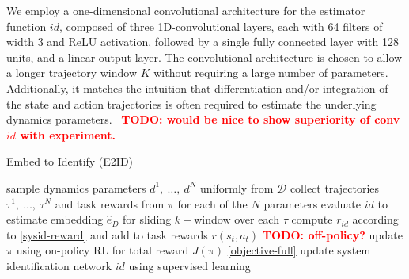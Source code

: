 \documentclass{article}
\newcommand{\E}{\mathbb{E}}
\newcommand{\TODO}[1]{\textcolor{red}{\textbf{TODO: #1}}}
\newcommand{\cA}{\mathcal{A}}
\newcommand{\cH}{\mathcal{H}}
\newcommand{\cL}{\mathcal{L}}
\newcommand{\cS}{\mathcal{S}}
\newcommand{\idfn}{id}
\newcommand{\latent}{\cL}
\newcommand{\idset}{\mathcal{D}}
\newcommand{\idvar}{d}
\begin{document}
We employ a one-dimensional convolutional architecture for the estimator function $\idfn$,
composed of three 1D-convolutional layers, each with 64 filters of width 3 and ReLU activation,
followed by a single fully connected layer with 128 units, and a linear output layer.
The convolutional architecture is chosen to allow a longer trajectory window $K$ without requiring a large number of parameters.
Additionally, it matches the intuition that differentiation and/or integration of the state and action trajectories
is often required to estimate the underlying dynamics parameters.
~\TODO{would be nice to show superiority of conv $\idfn$ with experiment.}




\begin{algorithm}[hb]
\caption{Embed to Identify (E2ID)}
\begin{algorithmic}
  \State sample dynamics parameters $\idvar^1,\ \dots,\ \idvar^N$ uniformly from $\idset$
  \State collect trajectories $\tau^1,\ \dots,\ \tau^N$ and task rewards from $\pi$ for each of the $N$ parameters
  \State evaluate $\idfn$ to estimate embedding $\hat e_D$ for sliding $k-$window over each $\tau$
  \State compute $r_{\idfn}$ according to \eqref{sysid-reward} and add to task rewards $r(s_t,a_t)$
  \State \TODO{off-policy?} update $\pi$ using on-policy RL for total reward $J(\pi)$ \eqref{objective-full}
  \State update system identification network $\idfn$ using supervised learning
\EndFor
\end{algorithmic}
\label{algo}
\end{algorithm}

\end{document}
